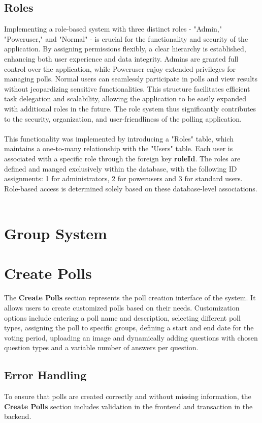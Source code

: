 \documentclass[a4paper,12pt]{report}
\begin{document}
\subsection{Roles}
Implementing a role-based system with three distinct roles - "Admin," "Poweruser," and "Normal" - is crucial for the functionality and security of the application. By assigning permissions flexibly, a clear hierarchy is established, enhancing both user experience and data integrity. Admins are granted full control over the application, while Poweruser enjoy extended privileges for managing polls. Normal users can seamlessly participate in polls and view results without jeopardizing sensitive functionalities. This structure facilitates efficient task delegation and scalability, allowing the application to be easily expanded with additional roles  in the future. The role system thus significantly contributes to the security, organization, and user-friendliness of the polling application.\\\\


This functionality was implemented by introducing a "Roles" table, which maintains a one-to-many relationship with the "Users" table. Each user is associated with a specific role through the foreign key \textbf{roleId}. The roles are defined and manged exclusively within the database, with the following ID assignments: 1 for administrators, 2 for powerusers and 3 for standard users. Role-based access is determined solely based on these database-level associations.\\\\


\section{Group System}

\section{Create Polls}
The \textbf{Create Polls} section represents the poll creation interface of the system. It allows users to create customized polls based on their needs. Customization options include entering a poll name and description, selecting different poll types, assigning the poll to specific groups, defining a start and end date for the voting period, uploading an image and dynamically adding questions with chosen question types and a variable number of answers per question.
\subsection{Error Handling}
To ensure that polls are created correctly and without missing information, the \textbf{Create Polls} section includes validation in the frontend and transaction in the backend.
\end{document}
